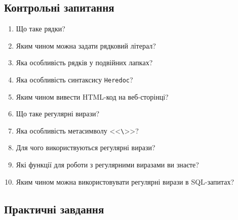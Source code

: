 \subsection*{Контрольні запитання}
\nopagebreak[4]
\begin{enumerate}
\item Що таке рядки?
\item Яким чином можна задати рядковий літерал?
\item Яка особливість рядків у подвійних лапках?
\item Яка особливість синтаксису \verb'Heredoc'? 
\item Яким чином вивести HTML-код на веб-сторінці?
\item Що таке регулярні вирази?
\item Яка особливість метасимволу <<\verb'\'>>?
\item Для чого використвуються регулярні вирази?
\item Які функції для роботи з регулярними виразами ви знаєте?
\item Яким чином можна використовувати регулярні вирази в SQL-запитах?
\end{enumerate}

\subsection*{Практичні завдання}
\nopagebreak[4]


